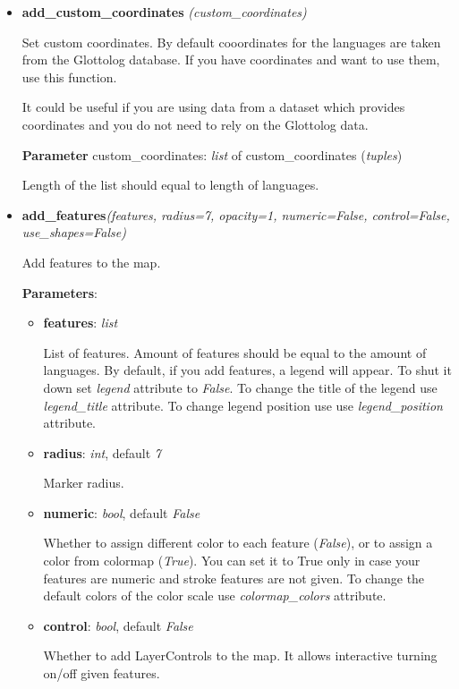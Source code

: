 \documentclass[a4paper,12pt]{article}
\begin{document}
\begin{itemize}

 \item \textbf{add\_custom\_coordinates} \textit{(custom\_coordinates)}

 Set custom coordinates. By default cooordinates for the languages are taken from the Glottolog database. If you have coordinates and want to use them, use this function.
 
 It could be useful if you are using data from a dataset which provides coordinates and you do not need to rely on the Glottolog data.
        
 \textbf{Parameter} custom\_coordinates: \textit{list} of custom\_coordinates (\textit{tuples})
 
 Length of the list should equal to length of languages.

 \item \textbf{add\_features}\textit{(features, radius=7, opacity=1, numeric=False, control=False, use\_shapes=False)}
 
 Add features to the map.
 
 \textbf{Parameters}:
 \begin{itemize}
 \item \textbf{features}: \textit{list}
 
 List of features. Amount of features should be equal to the amount of languages.
 By default, if you add features, a legend will appear. To shut it down set \textit{legend} attribute to \textit{False}.
 To change the title of the legend use \textit{legend\_title} attribute.
 To change legend position use use \textit{legend\_position} attribute.
 
 \item \textbf{radius}: \textit{int}, default \textit{7}
 
 Marker radius.
 
 \item \textbf{numeric}: \textit{bool}, default \textit{False}
  
  Whether to assign different color to each feature (\textit{False}), or to assign a color from colormap (\textit{True}).
  You can set it to True only in case your features are numeric and stroke features are not given.
  To change the default colors of the color scale use \textit{colormap\_colors} attribute.
  
  \item \textbf{control}: \textit{bool}, default \textit{False}

  Whether to add LayerControls to the map.
  It allows interactive turning on/off given features.


\end{itemize}
\end{itemize}
\end{document}
